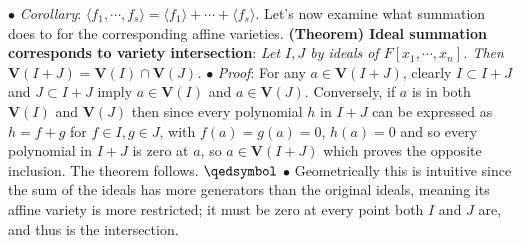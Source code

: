 \documentclass{article}
\newcommand*{\tb}{\textbf}
\newcommand*{\ti}{\textit}
\newcommand*{\n}{\newline}
\newcommand*{\nn}{\newline \newline}
\newcommand*{\Fx}{\ensuremath{F[x_1, \cdots, x_n]}}
\newcommand*{\lfsr}{\langle f_1, \cdots, f_s \rangle}
\newcommand*{\V}{\ensuremath{\mathbf{V}}}
\begin{document}
\n
\indent $ \bullet $ \ti{Corollary}: $ \lfsr = \langle f_1 \rangle + \cdots + \langle f_s \rangle $.
\nn
Let's now examine what summation does to for the corresponding affine varieties.
\nn
\tb{(Theorem) Ideal summation corresponds to variety intersection}: \ti{Let $ I, J $ by ideals of $ \Fx $. Then $ \V(I + J) = \V(I) \cap \V(J) $.}
\n
\indent $ \bullet $ \ti{Proof}: For any $ a \in \V(I + J) $, clearly $ I \subset I + J $ and $ J \subset I + J $ imply $ a \in \V(I) $ and $ a \in \V(J) $. Conversely, if $ a $ is in both $ \V(I) $ and $ \V(J) $ then since every polynomial $ h $ in $ I + J $ can be expressed as $ h = f + g $ for $ f \in I, g \in J $, with $ f(a) = g(a) = 0 $, $ h(a) = 0 $ and so every polynomial in $ I + J $ is zero at $ a $, so $ a \in \V(I + J) $ which proves the opposite inclusion. The theorem follows. $ \qedsymbol $
\n
\indent $ \bullet $ Geometrically this is intuitive since the sum of the ideals has more generators than the original ideals, meaning its affine variety is more restricted; it must be zero at every point both $ I $ and $ J $ are, and thus is the intersection.
\end{document}
